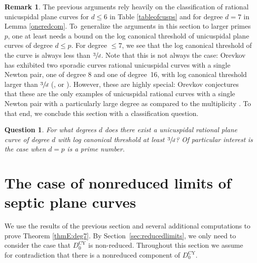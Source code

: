 \documentclass[JEP,XML,SOM,Unicode,NoFloatCountersInSection,published]{cedram}
\theoremstyle{plain}
\newtheorem*{question}{Question}
\theoremstyle{definition}
\newtheorem{remark}[theorem]{Remark}
\newcommand\Dcyo{{D^{\mathrm{CY}}_0}}
\begin{document}
\begin{remark}\label{unicuspidal}
The previous arguments rely heavily on the classification of rational unicuspidal plane curves for $d \le 6$ in Table \ref{tableofcusps} and for degree $d = 7$ in Lemma \ref{oneredcom}. To~generalize the arguments in this section to larger primes $p$, one at least needs a bound on the log canonical threshold of unicuspidal plane curves of degree $d \le p$. For degree $\le 7$, we see that the log canonical threshold of the curve is always less than $\sfrac{3}{d}$. Note that this is not always the case: Orevkov has exhibited two sporadic curves rational unicuspidal curves with a single Newton pair, one of degree 8 and one of degree~16, with log canonical threshold larger than $\sfrac{3}{d}$ (\cite{Orevkov}, or \cite[Th.\,1.1(e)(f)]{Unicuspidalcurves}). However, these are highly special: Orevkov conjectures that these are the only exam\-ples of unicuspidal rational curves with a single Newton pair with a particularly large degree as compared to the multiplicity \cite[p.\,2]{Orevkov}. To that end, we conclude this section with a classification question.
\end{remark}

\begin{question}
For what degrees $d$ does there exist a unicuspidal rational plane curve of degree $d$ with log canonical threshold at least $\sfrac{3}{d}$? Of particular interest is the case when $d = p$ is a prime number.
\end{question}

\section{The case of nonreduced limits of septic plane curves}\label{sec:nonreduceddeg7}

We use the results of the previous section and several additional computations to prove Theorem \ref{thmE:deg7}. By Section~\ref{sec:reducedlimits}, we only need to consider the case that $\Dcyo$ is non-reduced. Throughout this section we assume for contradiction that there is a nonreduced component of $\Dcyo$.
\end{document}
